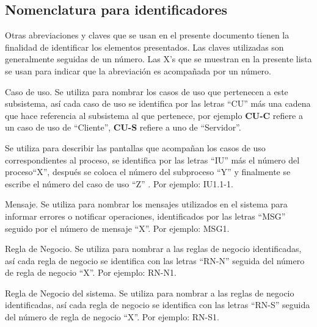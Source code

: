 \subsection{Nomenclatura para identificadores}\label{ssec:nomenclatura}

Otras abreviaciones y claves que se usan en el presente documento tienen la finalidad de identificar los elementos presentados. Las claves utilizadas son generalmente seguidas de un número. Las X’s que se muestran en la presente lista se usan para indicar que la abreviación es acompañada por un número.

\begin{description}
	
	 Caso de uso. Se utiliza para nombrar los casos de uso que pertenecen a este subsistema, así cada caso de uso se identifica por las letras ``CU'' más una cadena que hace referencia al subsistema al que pertenece, por ejemplo \textbf{CU-C} refiere a un caso de uso de ``Cliente'', \textbf{CU-S} refiere a uno de ``Servidor''.
	
	 Se utiliza para describir las pantallas que acompañan los casos de uso correspondientes al proceso, se identifica por las letras ``IU'' más el número del proceso``X'', después se coloca el número del subproceso ``Y'' y finalmente se escribe el número del caso de uso ``Z'' . Por ejemplo: IU1.1-1.

	 Mensaje. Se utiliza para nombrar los mensajes utilizados en el sistema para informar errores o notificar operaciones, identificados por las letras ``MSG'' seguido por el número de mensaje ``X''. Por ejemplo: MSG1.
	
	 Regla de Negocio. Se utiliza para nombrar a las reglas de negocio identificadas, así cada regla de negocio se identifica con las letras ``RN-N'' seguida del número de regla de negocio ``X''. Por ejemplo: RN-N1.
	
	 Regla de Negocio del sistema. Se utiliza para nombrar a las reglas de negocio identificadas, así cada regla de negocio se identifica con las letras ``RN-S'' seguida del número de regla de negocio ``X''. Por ejemplo: RN-S1.	
		
\end{description}